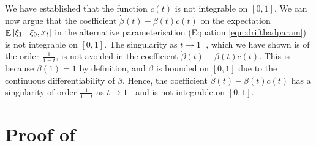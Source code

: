 We have established that the function \(c(t)\) is not integrable on \([0, 1]\). We can now argue that the coefficient \(\dot{\beta}(t) - \beta(t) c(t)\) on the expectation \(\mathop{\mathbb{E}}\qty[\xi_{1} \mid \xi_{0}, x_{t}]\) in the alternative parameterisation (Equation \ref{eqn:driftbadparam}) is not integrable on \([0, 1]\). The singularity  as \(t \to 1^{-}\), which we have shown is of the order \(\frac{1}{1-t}\), is not avoided in the coefficient \(\dot{\beta}(t) - \beta(t)c(t)\). This is because \(\beta(1) = 1\) by definition, and \(\dot{\beta}\) is bounded on \([0, 1]\) due to the continuous differentiability of \(\beta\). Hence, the coefficient \(\dot{\beta}(t) - \beta(t)c(t)\) has a singularity of order \(\frac{1}{1-t}\) as \(t\to 1^{-}\) and is not integrable on \([0, 1]\).

\section{Proof of }\label{prf:prp:loss}
\restateprploss*

